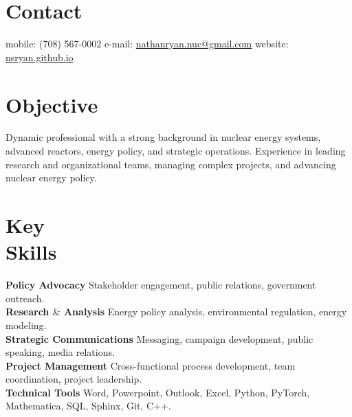 \documentclass[margin,line]{resume}
\begin{document}
\begin{resume}

%


    \section{\mysidestyle Contact}
    mobile: (708) 567-0002 \hfill e-mail: \href{mailto:nathanryan.nuc@gmail.com}{nathanryan.nuc@gmail.com} \hfill website: \href{https://nsryan.github.io}{nsryan.github.io} \vspace{0mm}\\\vspace{1mm}%

    \vspace{-6mm}
    \section{\mysidestyle Objective}

        Dynamic professional with a strong background in nuclear energy systems, advanced reactors, energy policy, and strategic operations. Experience in leading research and organizational teams, managing complex projects, and advancing nuclear energy policy.
    \section{\mysidestyle Key\\Skills}
        \textbf{Policy Advocacy} Stakeholder engagement, public relations, government outreach.\vspace{1mm}\\
        \textbf{Research $\&$ Analysis} Energy policy analysis, environmental regulation, energy modeling.\vspace{1mm}\\
        \textbf{Strategic Communications} Messaging, campaign development, public speaking, media relations.\vspace{1mm}\\
        \textbf{Project Management} Cross-functional process development, team coordination, project leadership.\vspace{1mm}\\
        \textbf{Technical Tools} Word, Powerpoint, Outlook, Excel, Python, PyTorch, Mathematica, SQL, Sphinx, Git, C++.\vspace{1mm}

\end{resume}
\end{document}
